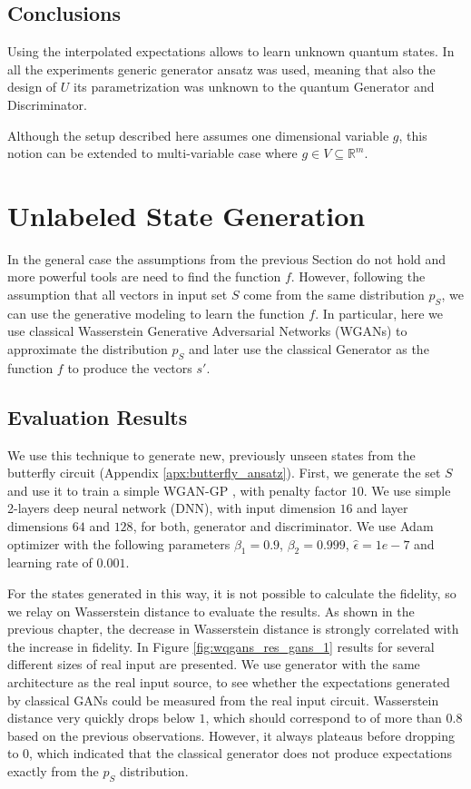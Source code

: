 \subsection{Conclusions}
Using the interpolated expectations allows to learn unknown quantum states.
In all the experiments generic generator ansatz was used, meaning that also the
design of $U$ its parametrization was unknown to the quantum Generator and
Discriminator.

Although the setup described here assumes one dimensional variable $g$, this
notion can be extended to multi-variable case where $g \in V \subseteq
\mathbb{R}^m$.



\section{Unlabeled State Generation}
In the general case the assumptions from the previous Section do not hold and
more powerful tools are need to find the function $f$. However, following the assumption
that all vectors in input set $S$ come from the same distribution $p_S$, we can use
the generative modeling to learn the function $f$. In particular, here we use
classical Wasserstein Generative Adversarial Networks (WGANs) to approximate the
distribution $p_S$ and later use the classical Generator as the function $f$ to
produce the vectors $s'$. 

\subsection{Evaluation Results}
We use this technique to generate new, previously unseen states from the butterfly circuit
(Appendix \ref{apx:butterfly_ansatz}). First, we generate the set $S$ and use it
to train a simple WGAN-GP \cite{gulrajani2017improved}, with penalty factor
$10$. We use simple 2-layers deep neural network (DNN), with input dimension $16$ and
layer dimensions $64$ and $128$, for both, generator and
discriminator. We use Adam optimizer \cite{kingma2017adam} with the following
parameters $\beta_1 = 0.9$, $\beta_2 = 0.999$, $\hat{\epsilon} = 1e - 7$ and
learning rate of $0.001$. 

For the states generated in this way, it is not possible to calculate the fidelity, so we
relay on Wasserstein distance to evaluate the results. As shown in the previous
chapter, the decrease in Wasserstein distance is strongly correlated with
the increase in fidelity. In Figure \ref{fig:wqgans_res_gans_1} results for
several different sizes of real input are presented. We use generator with the
same architecture as the real input source, to see whether the expectations
generated by classical GANs could be measured from the real input circuit.
Wasserstein distance very quickly drops below $1$, which should correspond to of
more than $0.8$ based on the previous observations. However, it always plateaus
before dropping to 0, which indicated that the classical generator does not
produce expectations exactly from the $p_S$ distribution.

